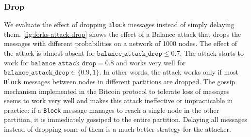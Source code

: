 \subsubsection{Drop}
We evaluate the effect of dropping \texttt{Block} messages instead of simply delaying them.
\cref{fig:forks-attack-drop} shows the effect of a Balance attack that drops the messages with different probabilities on a network of \num{1000} nodes.
The effect of the attack is almost absent for $\texttt{balance\_attack\_drop} \leq 0.7$.
The attack starts to work for $\texttt{balance\_attack\_drop} = 0.8$ and works very well for $\texttt{balance\_attack\_drop} \in \{0.9, 1\}$.
In other words, the attack works only if most \texttt{Block} messages between nodes in different partitions are dropped.
The gossip mechanism implemented in the Bitcoin protocol to tolerate loss of messages seems to work very well and makes this attack ineffective or impracticable in practice:
if a \texttt{Block} message manages to reach a single node in the other partition, it is immediately gossiped to the entire partition.
Delaying all messages instead of dropping some of them is a much better strategy for the attacker.

